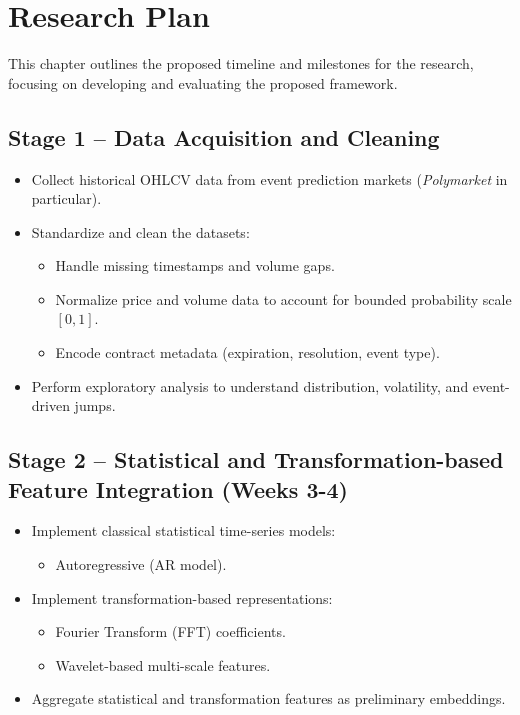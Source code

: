 \chapter{Research Plan}

This chapter outlines the proposed timeline and milestones for the research, focusing on developing and evaluating the proposed framework.

\section{Stage 1 – Data Acquisition and Cleaning}

\begin{itemize}
    \item Collect historical OHLCV data from event prediction markets (\textit{Polymarket} in particular).
    \item Standardize and clean the datasets:
        \begin{itemize}
            \item Handle missing timestamps and volume gaps.
            \item Normalize price and volume data to account for bounded probability scale $[0,1]$.
            \item Encode contract metadata (expiration, resolution, event type).
        \end{itemize}
    \item Perform exploratory analysis to understand distribution, volatility, and event-driven jumps.
\end{itemize}

\section{Stage 2 – Statistical and Transformation-based Feature Integration (Weeks 3-4)}

\begin{itemize}
    \item Implement classical statistical time-series models:
        \begin{itemize}
            \item Autoregressive (AR model).
        \end{itemize}
    \item Implement transformation-based representations:
        \begin{itemize}
            \item Fourier Transform (FFT) coefficients.
            \item Wavelet-based multi-scale features.
        \end{itemize}
    \item Aggregate statistical and transformation features as preliminary embeddings.
\end{itemize}

